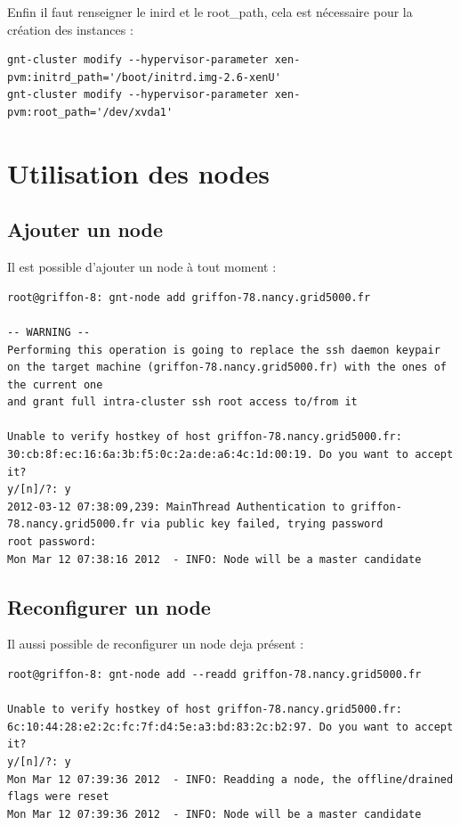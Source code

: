 Enfin il faut renseigner le inird et le root\_path, cela est nécessaire pour la création des instances :
\begin{lstlisting}
gnt-cluster modify --hypervisor-parameter xen-pvm:initrd_path='/boot/initrd.img-2.6-xenU'
gnt-cluster modify --hypervisor-parameter xen-pvm:root_path='/dev/xvda1'
\end{lstlisting}  

\section {Utilisation des nodes}
\subsection {Ajouter un node}
Il est possible d'ajouter un node à tout moment :
\begin{lstlisting}
root@griffon-8: gnt-node add griffon-78.nancy.grid5000.fr

-- WARNING -- 
Performing this operation is going to replace the ssh daemon keypair
on the target machine (griffon-78.nancy.grid5000.fr) with the ones of the current one
and grant full intra-cluster ssh root access to/from it

Unable to verify hostkey of host griffon-78.nancy.grid5000.fr:
30:cb:8f:ec:16:6a:3b:f5:0c:2a:de:a6:4c:1d:00:19. Do you want to accept
it?
y/[n]/?: y
2012-03-12 07:38:09,239: MainThread Authentication to griffon-78.nancy.grid5000.fr via public key failed, trying password
root password:
Mon Mar 12 07:38:16 2012  - INFO: Node will be a master candidate
\end{lstlisting}
\subsection{Reconfigurer un node}
Il aussi possible de reconfigurer un node deja présent :
\begin{lstlisting}
root@griffon-8: gnt-node add --readd griffon-78.nancy.grid5000.fr

Unable to verify hostkey of host griffon-78.nancy.grid5000.fr:
6c:10:44:28:e2:2c:fc:7f:d4:5e:a3:bd:83:2c:b2:97. Do you want to accept
it?
y/[n]/?: y
Mon Mar 12 07:39:36 2012  - INFO: Readding a node, the offline/drained flags were reset
Mon Mar 12 07:39:36 2012  - INFO: Node will be a master candidate
\end{lstlisting}

